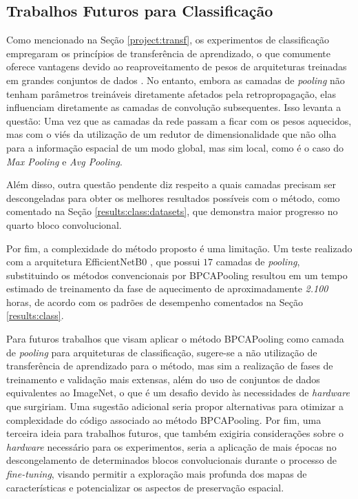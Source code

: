 \subsection{Trabalhos Futuros para Classificação}
\label{conclusion:class:future}
Como mencionado na Seção \ref{project:transf}, os experimentos de classificação empregaram os princípios de transferência de aprendizado, o que comumente oferece vantagens devido ao reaproveitamento de pesos de arquiteturas treinadas em grandes conjuntos de dados \citep{Pan2010}. No entanto, embora as camadas de \textit{pooling} não tenham parâmetros treináveis diretamente afetados pela retropropagação, elas influenciam diretamente as camadas de convolução subsequentes. Isso levanta a questão:  Uma vez que as camadas da rede passam a ficar com os pesos aquecidos, mas com o viés da utilização de um redutor de dimensionalidade que não olha para a informação espacial de um modo global, mas sim local, como é o caso do \textit{Max Pooling} e \textit{Avg Pooling}.

Além disso, outra questão pendente diz respeito a quais camadas precisam ser descongeladas para obter os melhores resultados possíveis com o método, como comentado na Seção \ref{results:class:datasets}, que demonstra maior progresso no quarto bloco convolucional.

Por fim, a complexidade do método proposto é uma limitação. Um teste realizado com a arquitetura EfficientNetB0 \citep{Tan2019Efficientnet:Networks}, que possui $17$ camadas de \textit{pooling}, substituindo os métodos convencionais por BPCAPooling resultou em um tempo estimado de treinamento da fase de aquecimento de aproximadamente \textit{2.100} horas, de acordo com os padrões de desempenho comentados na Seção \ref{results:class}.

Para futuros trabalhos que visam aplicar o método BPCAPooling como camada de \textit{pooling} para arquiteturas de classificação, sugere-se a não utilização de transferência de aprendizado para o método, mas sim a realização de fases de treinamento e validação mais extensas, além do uso de conjuntos de dados equivalentes ao ImageNet, o que é um desafio devido às necessidades de \textit{hardware} que surgiriam. Uma sugestão adicional seria propor alternativas para otimizar a complexidade do código associado ao método BPCAPooling. Por fim, uma terceira ideia para trabalhos futuros, que também exigiria considerações sobre o \textit{hardware} necessário para os experimentos, seria a aplicação de mais épocas no descongelamento de determinados blocos convolucionais durante o processo de \textit{fine-tuning}, visando permitir a exploração mais profunda dos mapas de características e potencializar os aspectos de preservação espacial.


